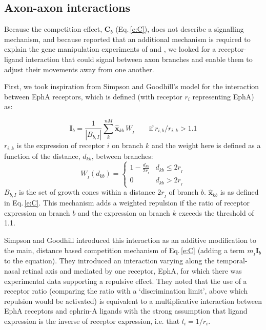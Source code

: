 \documentclass[11pt, a4paper, draft]{article}
\begin{document}
\subsection*{Axon-axon interactions}

Because the competition effect, $\mathbf{C}_b$ (Eq.\,\ref{e:C}), does not
describe a signalling mechanism, and because \citet{simpson_simple_2011}
reported that an additional mechanism is required to explain the gene
manipulation experiments of \citet{brown_topographic_2000}
and \citet{reber_relative_2004}, we looked for a receptor-ligand interaction
that could signal between axon branches and enable them to adjust their
movements away from one another.

First, we took inspiration from Simpson and Goodhill's model for the
interaction between EphA receptors, which is defined (with receptor $r_i$
representing EphA) as:

%
\begin{equation}
\mathbf{I}_b
= \frac{1}{|B_{b,I}|} \sum_k^{nM} \hat{\mathbf{x}}_{kb}\,W_{\!_I} \qquad \mathrm{if}~r_{i,b}
/ r_{i,k} > 1.1
\end{equation}
%
$r_{i,k}$ is the expression of receptor $i$ on branch $k$ and the weight here
is defined as a function of the distance, $d_{kb}$, between branches:
%
\begin{equation} \label{e:WI}
W_{\!_I}(d_{kb}) = \begin{cases}
      1 - \frac{d_{kb}}{2r_{\!_I}}   & d_{kb} \leq 2r_{\!_I} \\
     0 & d_{kb} > 2r_{\!_I}
     \end{cases}
\end{equation}
%
$B_{b,I}$ is the set of growth cones within a distance $2r_{\!_I}$ of branch
$b$. $\hat{\mathbf{x}}_{kb}$ is as defined in Eq.\,\ref{e:C}. This mechanism
adds a weighted repulsion if the ratio of receptor expression on
branch $b$ and the expression on branch $k$ exceeds the threshold of 1.1.

Simpson and Goodhill introduced this interaction as an additive modification
to the main, distance based competition mechanism of Eq.\,\ref{e:C} (adding a
term $m_{\!_I} \mathbf{I}_b$ to the equation). They introduced an interaction
varying along the temporal-nasal retinal axis and mediated by one receptor,
EphA, for which there was experimental data supporting a repulsive
effect. They noted that the use of a receptor ratio (comparing the ratio with
a `discrimination limit', above which repulsion would be activated) is
equivalent to a multiplicative interaction between EphA receptors and ephrin-A
ligands with the strong assumption that ligand expression is the inverse of
receptor expression, i.e. that $l_i = 1/r_i$.
\end{document}
